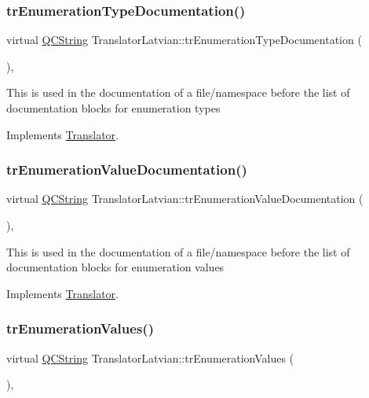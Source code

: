 \subsubsection{\texorpdfstring{trEnumerationTypeDocumentation()}{trEnumerationTypeDocumentation()}}
{\footnotesize\ttfamily virtual \mbox{\hyperlink{class_q_c_string}{Q\+C\+String}} Translator\+Latvian\+::tr\+Enumeration\+Type\+Documentation (\begin{DoxyParamCaption}{ }\end{DoxyParamCaption})\hspace{0.3cm}{\ttfamily [inline]}, {\ttfamily [virtual]}}

This is used in the documentation of a file/namespace before the list of documentation blocks for enumeration types 

Implements \mbox{\hyperlink{class_translator}{Translator}}.

\mbox{\label{class_translator_latvian_a1fcfc6a0ddc8a35840a0ce2ffc59fcee}} 
\subsubsection{\texorpdfstring{trEnumerationValueDocumentation()}{trEnumerationValueDocumentation()}}
{\footnotesize\ttfamily virtual \mbox{\hyperlink{class_q_c_string}{Q\+C\+String}} Translator\+Latvian\+::tr\+Enumeration\+Value\+Documentation (\begin{DoxyParamCaption}{ }\end{DoxyParamCaption})\hspace{0.3cm}{\ttfamily [inline]}, {\ttfamily [virtual]}}

This is used in the documentation of a file/namespace before the list of documentation blocks for enumeration values 

Implements \mbox{\hyperlink{class_translator}{Translator}}.

\mbox{\label{class_translator_latvian_a982bcaf79d436aa10cb72015208150ac}} 
\subsubsection{\texorpdfstring{trEnumerationValues()}{trEnumerationValues()}}
{\footnotesize\ttfamily virtual \mbox{\hyperlink{class_q_c_string}{Q\+C\+String}} Translator\+Latvian\+::tr\+Enumeration\+Values (\begin{DoxyParamCaption}{ }\end{DoxyParamCaption})\hspace{0.3cm}{\ttfamily [inline]}, {\ttfamily [virtual]}}

